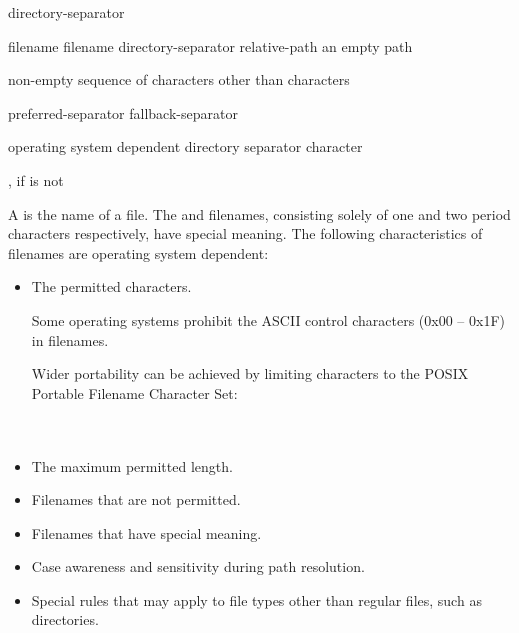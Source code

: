 \begin{ncbnf}
\br
    directory-separator
\end{ncbnf}

\begin{ncbnf}
\br
    filename\br
    filename directory-separator relative-path\br
    \textnormal{an empty path}
\end{ncbnf}

\begin{ncbnf}
\br
    \textnormal{non-empty sequence of characters other than  characters}
\end{ncbnf}

\begin{ncbnf}
\br
    preferred-separator \br
    fallback-separator 
\end{ncbnf}

\begin{ncbnf}
\br
    \textnormal{operating system dependent directory separator character}
\end{ncbnf}

\begin{ncbnf}
\br
    \textnormal{\tcode{/}, if  is not \tcode{/}}
\end{ncbnf}

\pnum
A  is
the name of a file. The  and  filenames,
consisting solely of one and two period characters respectively,
have special meaning.
The following characteristics of filenames are operating system dependent:
\begin{itemize}
\item The permitted characters.
\begin{example}
Some operating systems prohibit
      the ASCII control characters (0x00 -- 0x1F) in filenames.
\end{example}
\begin{note}
Wider portability can be achieved by limiting 
characters to the POSIX Portable Filename Character Set: \\
 \\
 \\
\end{note}
\item The maximum permitted length.
\item Filenames that are not permitted.
\item Filenames that have special meaning.
\item Case awareness and sensitivity during path resolution.
\item Special rules that may apply to file types other than regular
  files, such as directories.
\end{itemize}

